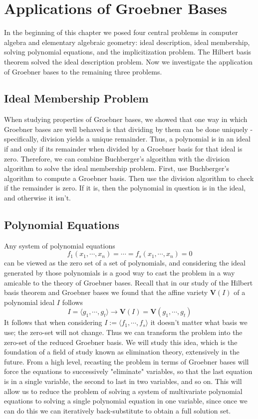 \documentclass{article}
\begin{document}
\section{Applications of Groebner Bases}
In the beginning of this chapter we posed four central problems in computer algebra and elementary algebraic geometry: ideal description, ideal membership, solving polynomial equations, and the implicitization problem. The Hilbert basis theorem solved the ideal description problem. Now we investigate the application of Groebner bases to the remaining three problems.

\subsection{Ideal Membership Problem}
When studying properties of Groebner bases, we showed that one way in which Groebner bases are well behaved is that dividing by them can be done uniquely - specifically, division yields a unique remainder. Thus, a polynomial is in an ideal if and only if its remainder when divided by a Groebner basis for that ideal is zero. Therefore, we can combine Buchberger's algorithm with the division algorithm to solve the ideal membership problem.
\newline
First, use Buchberger's algorithm to compute a Groebner basis. Then use the division algorithm to check if the remainder is zero. If it is, then the polynomial in question is in the ideal, and otherwise it isn't.

\subsection{Polynomial Equations}
Any system of polynomial equations 
$$ f_1(x_1, \cdots, x_n) = \cdots = f_s(x_1, \cdots, x_n) = 0 $$
can be viewed as the zero set of a set of polynomials, and considering the ideal generated by those polynomials is a good way to cast the problem in a way amicable to the theory of Groebner bases. Recall that in our study of the Hilbert basis theorem and Groebner bases we found that the affine variety $ \mathbf{V}(I) $ of a polynomial ideal $ I $ follows
$$ I = \langle g_1, \cdots, g_t \rangle \rightarrow \mathbf{V}(I) = \mathbf{V}(g_1, \cdots, g_t) $$
It follows that when considering $ I := \langle f_1, \cdots, f_s \rangle $ it doesn't matter what basis we use; the zero-set will not change. Thus we can transform the problem into the zero-set of the reduced Groebner basis. We will study this idea, which is the foundation of a field of study known as elimination theory, extensively in the future. From a high level, recasting the problem in terms of Groebner bases will force the equations to successively "eliminate" variables, so that the last equation is in a single variable, the second to last in two variables, and so on. This will allow us to reduce the problem of solving a system of multivariate polynomial equations to solving a single polynomial equation in one variable, since once we can do this we can iteratively back-substitute to obtain a full solution set.
\end{document}
